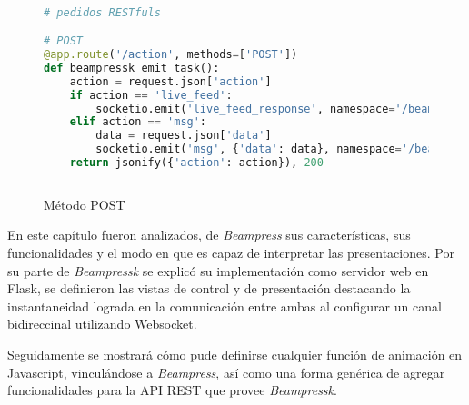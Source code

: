 			\begin{figure}[htb]%
				\begin{lstlisting}[language=Python]%

# pedidos RESTfuls

# POST
@app.route('/action', methods=['POST'])
def beampressk_emit_task():
    action = request.json['action']
    if action == 'live_feed':
        socketio.emit('live_feed_response', namespace='/beampressk')
    elif action == 'msg':
        data = request.json['data']
        socketio.emit('msg', {'data': data}, namespace='/beampressk')
    return jsonify({'action': action}), 200  
  
				\end{lstlisting}
			\caption{Método POST}
			\label{fig:post_method}
			\end{figure}			

			
			

	En este capítulo fueron analizados, de \textit{Beampress} sus características, sus funcionalidades y el modo en que es capaz de interpretar las presentaciones. Por su parte de \textit{Beampressk} se explicó su implementación como servidor web en Flask, se definieron las vistas de control y de presentación destacando la instantaneidad lograda en la comunicación entre ambas al configurar un canal bidireccinal utilizando Websocket.

	Seguidamente se mostrará cómo pude definirse cualquier función de animación en Javascript, vinculándose a \textit{Beampress}, así como una forma genérica de agregar funcionalidades para la API REST que provee \textit{Beampressk}.
		
